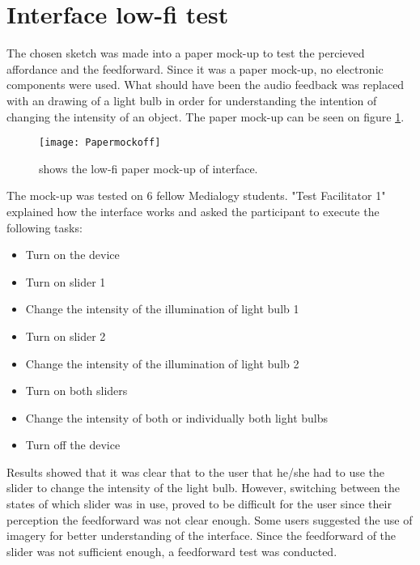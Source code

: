 \section{Interface low-fi test}
The chosen sketch was made into a paper mock-up to test the  percieved affordance and the  feedforward. Since it was a paper mock-up, no electronic components were used. What should have been the audio feedback was replaced with an drawing of a light bulb in order for understanding the intention of changing the intensity of an object. The paper mock-up can be seen on figure \ref{fig:Papermockoff}.

\begin{figure}[!h] 
\centering
\texttt{[image: Papermockoff]}
\caption{\label{fig:Papermockoff} shows the low-fi paper mock-up of interface.}
\end{figure}

The mock-up was tested on 6 fellow Medialogy students. "Test Facilitator 1" explained how the interface works and asked the participant to execute the following tasks:

\begin{itemize}
\item Turn on the device
\item Turn on slider 1
\item Change the intensity of the illumination of light bulb 1
\item Turn on slider 2
\item Change the intensity of the illumination of light bulb 2
\item Turn on both sliders
\item Change the intensity of both or individually both light bulbs
\item Turn off the device
\end{itemize}


Results showed that it was clear that to the user that he/she had to use the slider to change the intensity of the light bulb. However, switching between the states of which slider was in use, proved to be difficult for the user since their perception the feedforward was not clear enough. Some users suggested the use of imagery for better understanding of the interface.
Since the feedforward of the slider was not sufficient enough, a feedforward test was conducted.

